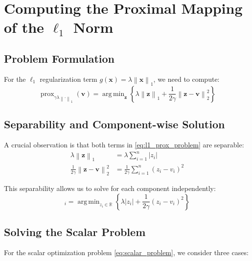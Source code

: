 \documentclass[12pt]{article}
\renewcommand{\vec}[1]{\mathbf{#1}}
\DeclareMathOperator{\prox}{prox}
\DeclareMathOperator{\argmin}{arg\,min}
\newcommand{\norm}[1]{\left\lVert#1\right\rVert}
\newcommand{\R}{\mathbb{R}}
\theoremstyle{definition}
\begin{document}

\newpage
\section{Computing the Proximal Mapping of the $\ell_1$ Norm}

\subsection{Problem Formulation}

For the $\ell_1$ regularization term $g(\vec{x}) = \lambda\norm{\vec{x}}_1$, we need to compute:
\begin{equation}
    \prox_{\gamma\lambda\norm{\cdot}_1}(\vec{v}) = \argmin_{\vec{z}} \left\{\lambda\norm{\vec{z}}_1 + \frac{1}{2\gamma}\norm{\vec{z} - \vec{v}}_2^2\right\}
    \label{eq:l1_prox_problem}
\end{equation}

\subsection{Separability and Component-wise Solution}

A crucial observation is that both terms in \eqref{eq:l1_prox_problem} are separable:
\begin{align}
    \lambda\norm{\vec{z}}_1                       & = \lambda\sum_{i=1}^n |z_i|                   \\
    \frac{1}{2\gamma}\norm{\vec{z} - \vec{v}}_2^2 & = \frac{1}{2\gamma}\sum_{i=1}^n (z_i - v_i)^2
\end{align}

This separability allows us to solve for each component independently:
\begin{equation}
    [\prox_{\gamma\lambda\norm{\cdot}_1}(\vec{v})]_i = \argmin_{z_i \in \R} \left\{\lambda|z_i| + \frac{1}{2\gamma}(z_i - v_i)^2\right\}
    \label{eq:scalar_problem}
\end{equation}

\subsection{Solving the Scalar Problem}

For the scalar optimization problem \eqref{eq:scalar_problem}, we consider three cases:
\end{document}
